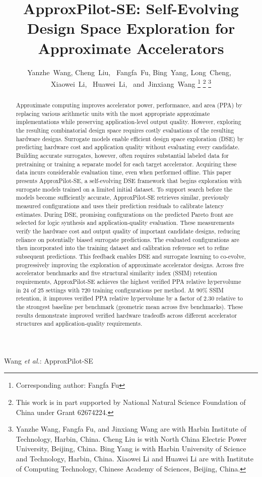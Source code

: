 \documentclass[10pt,journal,letterpaper]{IEEEtran}
\title{ApproxPilot-SE: Self-Evolving Design Space Exploration for Approximate Accelerators}
\author{Yanzhe~Wang,
        Cheng~Liu,~\IEEEmembership{Senior Member,~IEEE,}
        Fangfa~Fu,
        Bing~Yang,
        Long~Cheng,~\IEEEmembership{Senior Member,~IEEE,}\\
        Xiaowei~Li,~\IEEEmembership{Senior Member,~IEEE,}
        Huawei~Li,~\IEEEmembership{Senior Member,~IEEE,}
        and~Jinxiang~Wang%
\thanks{Corresponding author: Fangfa Fu}
\thanks{This work is in part supported by National Natural Science Foundation of China under Grant 62674224.}
\thanks{Yanzhe Wang, Fangfa Fu, and Jinxiang Wang are with Harbin Institute of Technology, Harbin, China. Cheng Liu is with North China Electric Power University, Beijing, China. Bing Yang is with Harbin University of Science and Technology, Harbin, China. Xiaowei Li and Huawei Li are with Institute of Computing Technology, Chinese Academy of Sciences, Beijing, China.}
}
\begin{document}
%
{Wang \MakeLowercase{\textit{et al.}}: ApproxPilot-SE}
\maketitle






\begin{abstract}
Approximate computing improves accelerator power, performance, and area (PPA) by replacing various arithmetic units with the most appropriate approximate implementations while preserving application-level output quality. However, exploring the resulting combinatorial design space requires costly evaluations of the resulting hardware designs. Surrogate models enable efficient design space exploration (DSE) by predicting hardware cost and application quality without evaluating every candidate. Building accurate surrogates, however, often requires substantial labeled data for pretraining or training a separate model for each target accelerator. Acquiring these data incurs considerable evaluation time, even when performed offline. This paper presents ApproxPilot-SE, a self-evolving DSE framework that begins exploration with surrogate models trained on a limited initial dataset. To support search before the models become sufficiently accurate, ApproxPilot-SE retrieves similar, previously measured configurations and uses their prediction residuals to calibrate latency estimates. During DSE, promising configurations on the predicted Pareto front are selected for logic synthesis and application-quality evaluation. These measurements verify the hardware cost and output quality of important candidate designs, reducing reliance on potentially biased surrogate predictions. The evaluated configurations are then incorporated into the training dataset and calibration reference set to refine subsequent predictions. This feedback enables DSE and surrogate learning to co-evolve, progressively improving the exploration of approximate accelerator designs. Across five accelerator benchmarks and five structural similarity index (SSIM) retention requirements, ApproxPilot-SE achieves the highest verified PPA relative hypervolume in 24 of 25 settings with 720 training configurations per method. At 90\% SSIM retention, it improves verified PPA relative hypervolume by a factor of 2.30 relative to the strongest baseline per benchmark (geometric mean across five benchmarks). These results demonstrate improved verified hardware tradeoffs across different accelerator structures and application-quality requirements.
\end{abstract}
\end{document}

